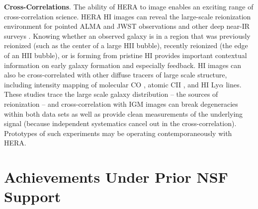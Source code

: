 \documentclass[preprint]{aastex}
\newcommand{\Mycitep}[1]{{\bf \citep{#1}}}
\newcommand{\compress}{\vspace{-0.25in}}
\begin{document}
{\bf Cross-Correlations}. The ability of HERA to image enables an exciting range of cross-correlation science.
HERA HI images can reveal the large-scale reionization environment for pointed ALMA and JWST
observations and other deep near-IR surveys \Mycitep{lidz_et_al2009}.
Knowing whether an observed galaxy is in a region that  was
previously reionized (such as the center of a large HII bubble), recently reionized (the edge of an HII bubble), or is forming from
pristine HI provides important contextual information on early galaxy formation and especially feedback.
HI images can also be cross-correlated with other diffuse
tracers of large scale structure, including intensity
mapping of molecular  CO \Mycitep{lidz_et_al2011}, atomic CII \citep{gong_et_al2011}, and HI Ly$\alpha$ \citep{silva_et_al2013} lines. These studies
trace the large scale galaxy distribution -- the sources of reionization -- and cross-correlation 
with IGM images can break degeneracies within both data sets as well as provide clean measurements of 
the underlying signal (because independent systematics cancel out in the cross-correlation). 
Prototypes of such experiments may be operating contemporaneously with HERA. 



\compress
\section{Achievements Under Prior NSF Support} %
\end{document}
